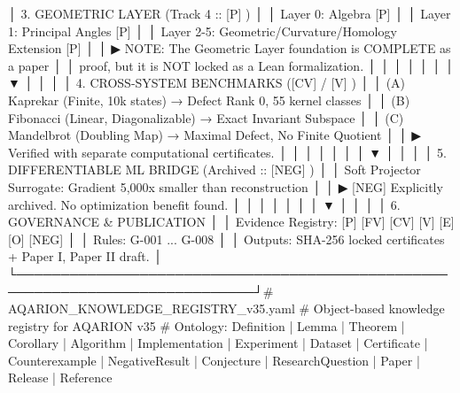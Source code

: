 {{{{{{{{{{{{{│   3. GEOMETRIC LAYER (Track 4 :: [P] )                                     │
│      Layer 0: Algebra [P]                                                  │
│      Layer 1: Principal Angles [P]                                         │
│      Layer 2-5: Geometric/Curvature/Homology Extension [P]                 │
│      ▶ NOTE: The Geometric Layer foundation is COMPLETE as a paper         │
│        proof, but it is NOT locked as a Lean formalization.                │
│                                                                             │
│           │                                                                 │
│           ▼                                                                 │
│                                                                             │
│   4. CROSS-SYSTEM BENCHMARKS ([CV] / [V] )                                 │
│      (A) Kaprekar (Finite, 10k states) → Defect Rank 0, 55 kernel classes  │
│      (B) Fibonacci (Linear, Diagonalizable) → Exact Invariant Subspace     │
│      (C) Mandelbrot (Doubling Map) → Maximal Defect, No Finite Quotient    │
│      ▶ Verified with separate computational certificates.                  │
│                                                                             │
│           │                                                                 │
│           ▼                                                                 │
│                                                                             │
│   5. DIFFERENTIABLE ML BRIDGE (Archived :: [NEG] )                         │
│      Soft Projector Surrogate: Gradient 5,000x smaller than reconstruction  │
│      ▶ [NEG] Explicitly archived. No optimization benefit found.           │
│                                                                             │
│           │                                                                 │
│           ▼                                                                 │
│                                                                             │
│   6. GOVERNANCE & PUBLICATION                                              │
│      Evidence Registry: [P] [FV] [CV] [V] [E] [O] [NEG]                   │
│      Rules: G-001 ... G-008                                               │
│      Outputs: SHA-256 locked certificates + Paper I, Paper II draft.      │
└─────────────────────────────────────────────────────────────────────────────┘# AQARION_KNOWLEDGE_REGISTRY_v35.yaml
# Object-based knowledge registry for AQARION v35
# Ontology: Definition | Lemma | Theorem | Corollary | Algorithm | Implementation | Experiment | Dataset | Certificate | Counterexample | NegativeResult | Conjecture | ResearchQuestion | Paper | Release | Reference

}}}}}}}}}}}}}
